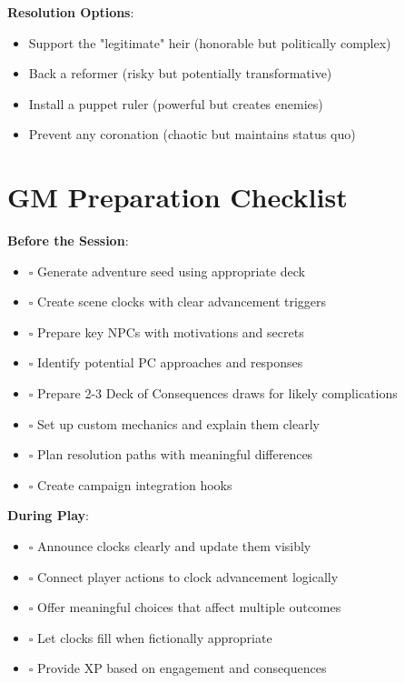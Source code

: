 \documentclass[11pt]{article}
\begin{document}
\begin{mdframed}[backgroundcolor=modulebg]
\textbf{Resolution Options}:
\begin{itemize}[leftmargin=*]
\item Support the "legitimate" heir (honorable but politically complex)
\item Back a reformer (risky but potentially transformative)
\item Install a puppet ruler (powerful but creates enemies)
\item Prevent any coronation (chaotic but maintains status quo)
\end{itemize}
\end{mdframed}

\section*{GM Preparation Checklist}

\begin{mdframed}[backgroundcolor=modulebg]
\textbf{Before the Session}:
\begin{itemize}[leftmargin=*]
\item $\square$ Generate adventure seed using appropriate deck
\item $\square$ Create scene clocks with clear advancement triggers
\item $\square$ Prepare key NPCs with motivations and secrets
\item $\square$ Identify potential PC approaches and responses
\item $\square$ Prepare 2-3 Deck of Consequences draws for likely complications
\item $\square$ Set up custom mechanics and explain them clearly
\item $\square$ Plan resolution paths with meaningful differences
\item $\square$ Create campaign integration hooks
\end{itemize}

\textbf{During Play}:
\begin{itemize}[leftmargin=*]
\item $\square$ Announce clocks clearly and update them visibly
\item $\square$ Connect player actions to clock advancement logically
\item $\square$ Offer meaningful choices that affect multiple outcomes
\item $\square$ Let clocks fill when fictionally appropriate
\item $\square$ Provide XP based on engagement and consequences
\end{itemize}
\end{mdframed}
\end{document}
